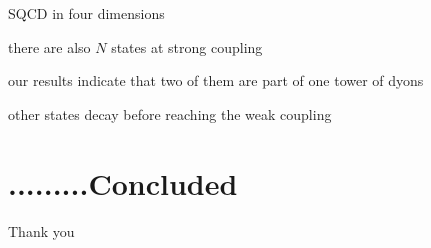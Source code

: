 \documentclass{beamer}
\begin{document}
\begin{frame}{SQCD in four dimensions}

\begin{block}{}

	\vspace{2mm}
	there are also $ N $ states at strong coupling
	\vspace{2mm}

\end{block}

\vspace{7mm}

\pause
\begin{block}{}

	\vspace{2mm}
	our results indicate that two of them are part of one tower of dyons
	\vspace{2mm}

\end{block}

\vspace{7mm}

\pause
\begin{block}{}

	\vspace{2mm}
	other states decay before reaching the weak coupling
	\vspace{2mm}

\end{block}

\end{frame}


\section{.........Concluded}


\begin{frame}{}

\fontsize{60pt}{60pt}\selectfont
\begin{center}
        Thank you
\end{center}


\end{frame}
\end{document}
